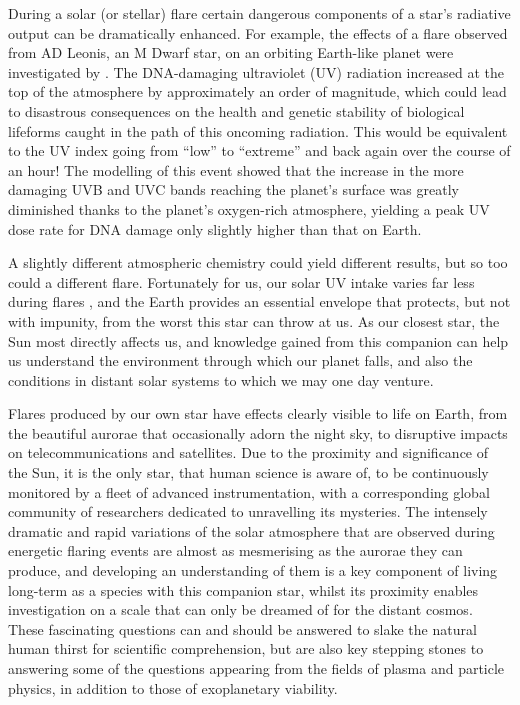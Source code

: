 During a solar (or stellar) flare certain dangerous components of a star's radiative output can be dramatically enhanced.
For example, the effects of a flare observed from AD Leonis, an M Dwarf star, on an orbiting Earth-like planet were investigated by \citet{Segura2010}.
The DNA-damaging ultraviolet (UV) radiation increased at the top of the atmosphere by approximately an order of magnitude, which could lead to disastrous consequences on the health and genetic stability of biological lifeforms caught in the path of this oncoming radiation.
This would be equivalent to the UV index going from ``low'' to ``extreme'' and back again over the course of an hour!
The modelling of this event showed that the increase in the more damaging UVB and UVC bands reaching the planet's surface was greatly diminished thanks to the planet's oxygen-rich atmosphere, yielding a peak UV dose rate for DNA damage only slightly higher than that on Earth.

A slightly different atmospheric chemistry could yield different results, but so too could a different flare.
Fortunately for us, our solar UV intake varies far less during flares \citep[e.g.][]{Woods2006}, and the Earth provides an essential envelope that protects, but not with impunity, from the worst this star can throw at us.
As our closest star, the Sun most directly affects us, and knowledge gained from this companion can help us understand the environment through which our planet falls, and also the conditions in distant solar systems to which we may one day venture.

Flares produced by our own star have effects clearly visible to life on Earth, from the beautiful aurorae that occasionally adorn the night sky, to disruptive impacts on telecommunications and satellites.
Due to the proximity and significance of the Sun, it is the only star, that human science is aware of, to be continuously monitored by a fleet of advanced instrumentation, with a corresponding global community of researchers dedicated to unravelling its mysteries.
The intensely dramatic and rapid variations of the solar atmosphere that are observed during energetic flaring events are almost as mesmerising as the aurorae they can produce, and developing an understanding of them is a key component of living long-term as a species with this companion star, whilst its proximity enables investigation on a scale that can only be dreamed of for the distant cosmos.
These fascinating questions can and should be answered to slake the natural human thirst for scientific comprehension, but are also key stepping stones to answering some of the questions appearing from the fields of plasma and particle physics, in addition to those of exoplanetary viability.

